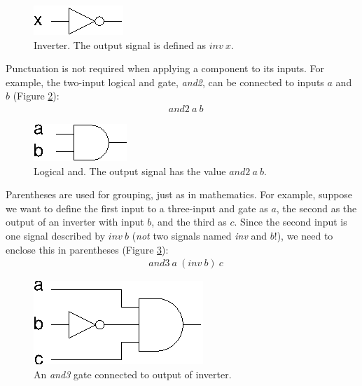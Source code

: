 \documentclass[a4paper,openany,fleqn]{book}
\begin{document}
\begin{figure}[htbp]
  \begin{center}
    \includegraphics{../figures/xfig/inv.eps}
    \caption{Inverter.  The output signal is defined as $\mathit{inv}\
      x$.}
    \label{fig:inv}
  \end{center}
\end{figure}

Punctuation is not required when applying a component to its inputs.
For example, the two-input logical and gate, \textit{and2}, can be
connected to inputs $a$ and $b$ (Figure \ref{fig:and2}):
\begin{align*}
& \mathit{and2}\ a\ b
\end{align*}

\begin{figure}[htbp]
  \begin{center}
    \includegraphics{../figures/xfig/and2.eps}
    \caption{Logical and.  The output signal has the value
      $\mathit{and2}\ a\ b$.}
    \label{fig:and2}
  \end{center}
\end{figure}

Parentheses are used for grouping, just as in mathematics.  For
example, suppose we want to define the first input to a three-input
and gate as $a$, the second as the output of an inverter with input
$b$, and the third as $c$.  Since the second input is one signal
described by $\mathit{inv}\ b$ (\emph{not} two signals named
\textit{inv} and $b$!), we need to enclose this in parentheses (Figure
\ref{fig:and3-inv}):
\begin{align*}
& \mathit{and3}\ a\ (\mathit{inv}\ b)\ c
\end{align*}

\begin{figure}[htbp]
  \begin{center}
    \includegraphics{../figures/xfig/inv-and3.eps}
    \caption{An \textit{and3} gate connected to output of inverter.}
    \label{fig:and3-inv}
  \end{center}
\end{figure}
\end{document}
